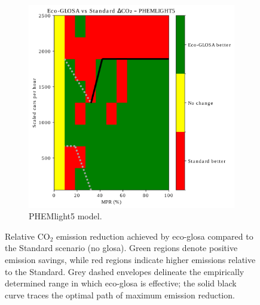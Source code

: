 \begin{figure}[htb]
\begin{subfigure}[b]{0.45\textwidth}
    \includegraphics[width=\textwidth]{data/img/BreakEven/delta_CO2_PHEMLIGHT5.pdf}
    \caption{PHEMlight5 model.}
    \label{fig:BE_EcoStd_PHEM}
  \end{subfigure}
  \caption{Relative CO$_2$ emission reduction achieved by \ac{eco-glosa} compared to the Standard scenario (no \ac{glosa}). Green regions denote positive emission savings, while red regions indicate higher emissions relative to the Standard. Grey dashed envelopes delineate the empirically determined range in which \ac{eco-glosa} is effective; the solid black curve traces the optimal path of maximum emission reduction.}
  \label{fig:BE_EcoStd}
\end{figure}


